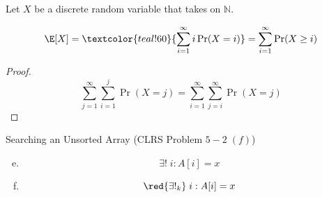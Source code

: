 
\begin{frame}{}
  \begin{theorem}
    Let $X$ be a discrete random variable that takes on  $\mathbb{N}$.

    \[
      \E[X] = \textcolor{teal!60}{\sum_{i=1}^{\infty} i \Pr(X = i)} = \sum_{i=1}^{\infty} \Pr(X \ge i)
    \]
  \end{theorem}
  \pause
  \begin{proof}
    \[
      \sum_{j=1}^{\infty} \sum_{i=1}^{j} \Pr(X = j) = \sum_{i=1}^{\infty} \sum_{j=i}^{\infty} \Pr(X = j)
    \]
  \end{proof}
\end{frame}

\begin{frame}{}
  \begin{exampleblock}{Searching an Unsorted Array (CLRS Problem $5-2\; (f)$)}
    

    \pause
    \begin{enumerate}[(a)]
      \setcounter{enumi}{4}
      \item \[ \exists!\; i: A[i] = x \]
      \item \[ \red{\exists!_{k}}\; i: A[i] = x \]
    \end{enumerate}
  \end{exampleblock}
\end{frame}

% 
% 

